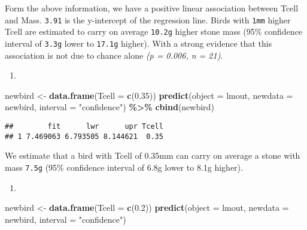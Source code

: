 \documentclass[
]{article}
\newenvironment{Shaded}{\begin{snugshade}}{\end{snugshade}}
\newcommand{\AttributeTok}[1]{\textcolor[rgb]{0.13,0.29,0.53}{#1}}
\newcommand{\FloatTok}[1]{\textcolor[rgb]{0.00,0.00,0.81}{#1}}
\newcommand{\FunctionTok}[1]{\textcolor[rgb]{0.13,0.29,0.53}{\textbf{#1}}}
\newcommand{\NormalTok}[1]{#1}
\newcommand{\OtherTok}[1]{\textcolor[rgb]{0.56,0.35,0.01}{#1}}
\newcommand{\SpecialCharTok}[1]{\textcolor[rgb]{0.81,0.36,0.00}{\textbf{#1}}}
\newcommand{\StringTok}[1]{\textcolor[rgb]{0.31,0.60,0.02}{#1}}
\providecommand{\tightlist}{%
  \setlength{\itemsep}{0pt}\setlength{\parskip}{0pt}}
\begin{document}
Form the above information, we have a positive linear association
between Tcell and Mass. \texttt{3.91} is the y-intercept of the
regression line. Birds with \texttt{1mm} higher Tcell are estimated to
carry on average \texttt{10.2g} higher stone mass (95\% confidence
interval of \texttt{3.3g} lower to \texttt{17.1g} higher). With a strong
evidence that this association is not due to chance alone \emph{(p =
0.006, n = 21)}.

\begin{enumerate}
\def\labelenumi{\arabic{enumi}.}
\setcounter{enumi}{1}
\tightlist
\item
\end{enumerate}

\begin{Shaded}
\begin{Highlighting}[]
\NormalTok{newbird }\OtherTok{\textless{}{-}} \FunctionTok{data.frame}\NormalTok{(}\AttributeTok{Tcell =} \FunctionTok{c}\NormalTok{(}\FloatTok{0.35}\NormalTok{))}
\FunctionTok{predict}\NormalTok{(}\AttributeTok{object =}\NormalTok{ lmout, }\AttributeTok{newdata =}\NormalTok{ newbird, }\AttributeTok{interval =} \StringTok{"confidence"}\NormalTok{) }\SpecialCharTok{\%\textgreater{}\%} \FunctionTok{cbind}\NormalTok{(newbird)}
\end{Highlighting}
\end{Shaded}

\begin{verbatim}
##        fit      lwr      upr Tcell
## 1 7.469063 6.793505 8.144621  0.35
\end{verbatim}

We estimate that a bird with Tcell of 0.35mm can carry on average a
stone with mass \texttt{7.5g} (95\% confidence interval of 6.8g lower to
8.1g higher).

\begin{enumerate}
\def\labelenumi{\arabic{enumi}.}
\setcounter{enumi}{2}
\tightlist
\item
\end{enumerate}

\begin{Shaded}
\begin{Highlighting}[]
\NormalTok{newbird }\OtherTok{\textless{}{-}} \FunctionTok{data.frame}\NormalTok{(}\AttributeTok{Tcell =} \FunctionTok{c}\NormalTok{(}\FloatTok{0.2}\NormalTok{))}
\FunctionTok{predict}\NormalTok{(}\AttributeTok{object =}\NormalTok{ lmout, }\AttributeTok{newdata =}\NormalTok{ newbird, }\AttributeTok{interval =} \StringTok{"confidence"}\NormalTok{)}
\end{Highlighting}
\end{Shaded}
\end{document}
